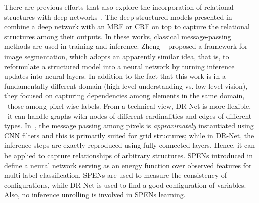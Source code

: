 \documentclass[10pt,twocolumn,letterpaper]{article}
\begin{document}
There are previous efforts that also explore the incorporation of relational structures 
with deep networks~\cite{chen2015learning, zheng2015conditional, schwing2015fully, belanger2015structured}. 
The deep structured models presented in \cite{chen2015learning,schwing2015fully,wu2016deep} combine
a deep network with an MRF or CRF on top to capture the relational structures among their outputs. 
In these works, classical message-passing methods are used in training and inference.
Zheng \etal~\cite{zheng2015conditional} proposed a framework for image segmentation,
which adopts an apparently similar idea, that is, 
to reformulate a structured model into a neural network by turning inference updates into neural layers. 
In addition to the fact that this work is in a fundamentally different domain 
(high-level understanding vs. low-level vision), 
they focused on capturing dependencies among elements in the same domain,
\eg~those among pixel-wise labels.
From a technical view, DR-Net is more flexible, 
\eg~it can handle graphs with nodes of different cardinalities and edges of different types.
In~\cite{zheng2015conditional}, the message passing among pixels is \emph{approximately} 
instantiated using CNN filters and this is primarily suited for grid structures; 
while in DR-Net, the inference steps are exactly reproduced using fully-connected layers.
Hence, it can be applied to capture relationships of arbitrary structures.
SPENs introduced in \cite{belanger2015structured} define a neural network 
serving as an energy function over observed features for multi-label classification.
SPENs are used to measure the consistency of configurations, 
while DR-Net is used to find a good configuration of variables.
Also, no inference unrolling is involved in SPENs learning.
\end{document}

